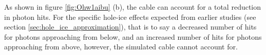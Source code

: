 As shown in figure \ref{fig:Ohw1aibu} (b), the cable can account for a total reduction in photon hits. For the specific hole-ice effects expected from earlier studies (see section \ref{sec:hole_ice_approximation}), that is to say a decreased number of hits for photons approaching from below, and an increased number of hits for photons approaching from above, however, the simulated cable cannot account for.

